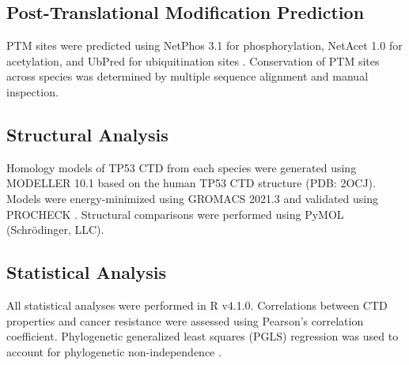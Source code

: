 \subsection{Post-Translational Modification Prediction}
PTM sites were predicted using NetPhos 3.1 for phosphorylation, NetAcet 1.0 for acetylation, and UbPred for ubiquitination sites \citep{blom1999sequence, kiemer2005netacet, radivojac2010identification}. Conservation of PTM sites across species was determined by multiple sequence alignment and manual inspection.

\subsection{Structural Analysis}
Homology models of TP53 CTD from each species were generated using MODELLER 10.1 \citep{webb2014comparative} based on the human TP53 CTD structure (PDB: 2OCJ). Models were energy-minimized using GROMACS 2021.3 \citep{abraham2015gromacs} and validated using PROCHECK \citep{laskowski1993procheck}. Structural comparisons were performed using PyMOL (Schrödinger, LLC).

\subsection{Statistical Analysis}
All statistical analyses were performed in R v4.1.0. Correlations between CTD properties and cancer resistance were assessed using Pearson's correlation coefficient. Phylogenetic generalized least squares (PGLS) regression was used to account for phylogenetic non-independence \citep{revell2010phylogenetic}.
